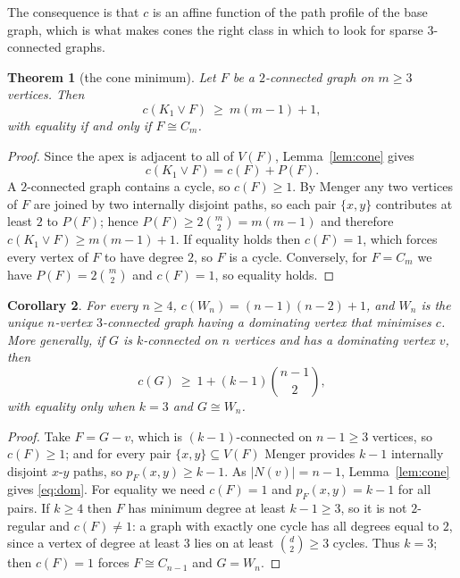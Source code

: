 \documentclass[11pt,a4paper]{article}
\newtheorem{theorem}{Theorem}[section]
\newtheorem{corollary}[theorem]{Corollary}
\theoremstyle{definition}
\newcommand{\cF}{c(F)}
\newcommand{\Wi}{W_n}
\begin{document}
The consequence is that $c$ is an affine function of the path profile of the
base graph, which is what makes cones the right class in which to look for
sparse $3$-connected graphs.

\begin{theorem}[the cone minimum]\label{thm:cone}
Let $F$ be a $2$-connected graph on $m\ge 3$ vertices.  Then
\[
  c(K_1\vee F)\ \ge\ m(m-1)+1 ,
\]
with equality if and only if $F\cong C_m$.
\end{theorem}

\begin{proof}
Since the apex is adjacent to all of $V(F)$, Lemma~\ref{lem:cone} gives
\[
  c(K_1\vee F) = \cF + P(F).
\]
A $2$-connected graph contains a cycle, so $\cF\ge 1$.  By Menger any two
vertices of $F$ are joined by two internally disjoint paths, so each pair
$\{x,y\}$ contributes at least $2$ to $P(F)$; hence
$P(F)\ge 2\binom m2 = m(m-1)$ and therefore $c(K_1\vee F)\ge m(m-1)+1$.
If equality holds then $\cF=1$, which forces every vertex of $F$ to have
degree $2$, so $F$ is a cycle.  Conversely, for $F=C_m$ we have
$P(F)=2\binom m2$ and $\cF=1$, so equality holds.
\end{proof}

\begin{corollary}\label{cor:wheel}
For every $n\ge 4$, $c(\Wi)=(n-1)(n-2)+1$, and $\Wi$ is the unique $n$-vertex
$3$-connected graph having a dominating vertex that minimises $c$.  More
generally, if $G$ is $k$-connected on $n$ vertices and has a dominating vertex
$v$, then
\begin{equation}\label{eq:dom}
  c(G)\ \ge\ 1 + (k-1)\binom{n-1}{2},
\end{equation}
with equality only when $k=3$ and $G\cong\Wi$.
\end{corollary}

\begin{proof}
Take $F=G-v$, which is $(k-1)$-connected on $n-1\ge 3$ vertices, so
$\cF\ge 1$; and for every pair $\{x,y\}\subseteq V(F)$ Menger provides $k-1$
internally disjoint $x$-$y$ paths, so $p_F(x,y)\ge k-1$.  As $|N(v)|=n-1$,
Lemma~\ref{lem:cone} gives \eqref{eq:dom}.  For equality we need $\cF=1$ and
$p_F(x,y)=k-1$ for all pairs.  If $k\ge 4$ then $F$ has minimum degree at
least $k-1\ge 3$, so it is not $2$-regular and $\cF\ne 1$: a graph with exactly
one cycle has all degrees equal to $2$, since a vertex of degree at least $3$
lies on at least $\binom d2\ge 3$ cycles.  Thus $k=3$; then $\cF=1$ forces
$F\cong C_{n-1}$ and $G=\Wi$.
\end{proof}
\end{document}
